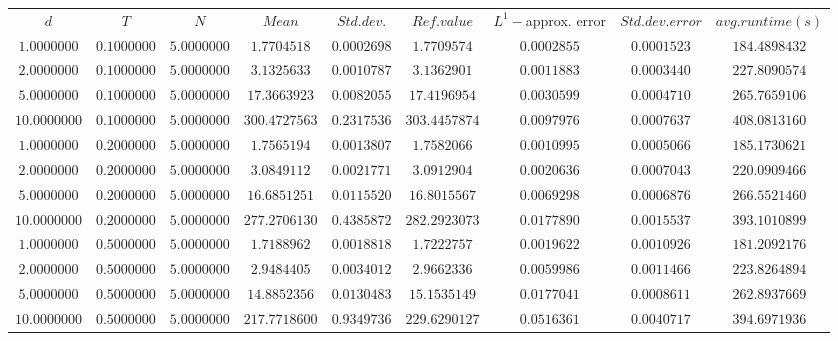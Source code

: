 \begin{tabular}{ccccccccc}
$d$ & $T$ & $N$ & $Mean$ & $Std. dev.$ & $Ref. value$ & $L^1-$approx. error & $Std. dev. error$ & $avg. runtime (s)$\\
$1.0000000$ & $0.1000000$ & $5.0000000$ & $1.7704518$ & $0.0002698$ & $1.7709574$ & $0.0002855$ & $0.0001523$ & $184.4898432$\\
$2.0000000$ & $0.1000000$ & $5.0000000$ & $3.1325633$ & $0.0010787$ & $3.1362901$ & $0.0011883$ & $0.0003440$ & $227.8090574$\\
$5.0000000$ & $0.1000000$ & $5.0000000$ & $17.3663923$ & $0.0082055$ & $17.4196954$ & $0.0030599$ & $0.0004710$ & $265.7659106$\\
$10.0000000$ & $0.1000000$ & $5.0000000$ & $300.4727563$ & $0.2317536$ & $303.4457874$ & $0.0097976$ & $0.0007637$ & $408.0813160$\\
$1.0000000$ & $0.2000000$ & $5.0000000$ & $1.7565194$ & $0.0013807$ & $1.7582066$ & $0.0010995$ & $0.0005066$ & $185.1730621$\\
$2.0000000$ & $0.2000000$ & $5.0000000$ & $3.0849112$ & $0.0021771$ & $3.0912904$ & $0.0020636$ & $0.0007043$ & $220.0909466$\\
$5.0000000$ & $0.2000000$ & $5.0000000$ & $16.6851251$ & $0.0115520$ & $16.8015567$ & $0.0069298$ & $0.0006876$ & $266.5521460$\\
$10.0000000$ & $0.2000000$ & $5.0000000$ & $277.2706130$ & $0.4385872$ & $282.2923073$ & $0.0177890$ & $0.0015537$ & $393.1010899$\\
$1.0000000$ & $0.5000000$ & $5.0000000$ & $1.7188962$ & $0.0018818$ & $1.7222757$ & $0.0019622$ & $0.0010926$ & $181.2092176$\\
$2.0000000$ & $0.5000000$ & $5.0000000$ & $2.9484405$ & $0.0034012$ & $2.9662336$ & $0.0059986$ & $0.0011466$ & $223.8264894$\\
$5.0000000$ & $0.5000000$ & $5.0000000$ & $14.8852356$ & $0.0130483$ & $15.1535149$ & $0.0177041$ & $0.0008611$ & $262.8937669$\\
$10.0000000$ & $0.5000000$ & $5.0000000$ & $217.7718600$ & $0.9349736$ & $229.6290127$ & $0.0516361$ & $0.0040717$ & $394.6971936$\\
\end{tabular}
